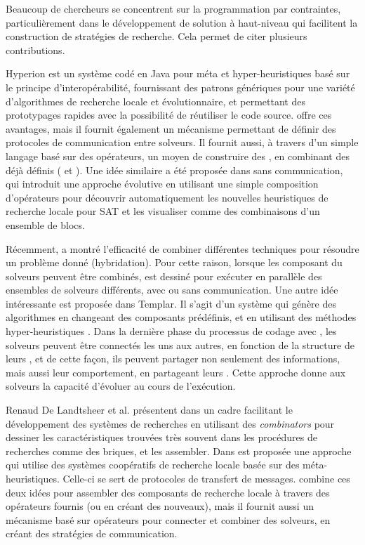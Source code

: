Beaucoup de chercheurs se concentrent sur la programmation par contraintes, particuli\`erement dans le d\'eveloppement de solution \`a haut-niveau qui facilitent la construction de strat\'egies de recherche. Cela permet de citer plusieurs contributions. 

{\sc Hyperion} \cite{Brownlee2014} est un syst\`eme cod\'e en Java pour m\'eta et hyper-heuristiques bas\'e sur le principe d'interop\'erabilit\'e, fournissant des patrons g\'en\'eriques pour une vari\'et\'e d'algorithmes de recherche locale et \'evolutionnaire, et permettant des prototypages rapides avec la possibilit\'e de r\'eutiliser le code source. \posl{} offre ces avantages, mais il fournit \'egalement un m\'ecanisme permettant de d\'efinir des protocoles de communication entre solveurs. Il fournit aussi, \`a travers d'un simple langage bas\'e sur des op\'erateurs, un moyen de construire des \ass, en combinant des \ms{} d\'ej\`a d\'efinis (\oms{} et \opchs). Une id\'ee similaire a \'et\'e propos\'ee dans \cite{Fukunaga2008} sans communication, qui introduit une approche \'evolutive en utilisant une simple composition d'op\'erateurs pour d\'ecouvrir automatiquement les nouvelles heuristiques de recherche locale pour SAT et les visualiser comme des combinaisons d'un ensemble de blocs.

R\'ecemment, \cite{El-Ghazali2013} a montr\'e l'efficacit\'e de combiner diff\'erentes techniques pour r\'esoudre un probl\`eme donn\'e (hybridation). Pour cette raison, lorsque les composant du solveurs peuvent \^etre combin\'es, \posl{} est dessin\'e pour ex\'ecuter en parall\`ele des ensembles de solveurs diff\'erents, avec ou sans communication. Une autre id\'ee int\'eressante est propos\'ee dans {\sc Templar}. Il s'agit d'un syst\`eme qui g\'en\`ere des algorithmes en changeant des composants pr\'ed\'efinis, et en utilisant des m\'ethodes hyper-heuristiques \cite{Swan2015}. Dans la derni\`ere phase du processus de codage avec \posl{}, les solveurs peuvent \^etre connect\'es les uns aux autres, en fonction de la structure de leurs \opchs, et de cette fa\c{c}on, ils peuvent partager non seulement des informations, mais aussi leur comportement, en partageant leurs \oms. Cette approche donne aux solveurs la capacit\'e d'\'evoluer au cours de l'ex\'ecution.

Renaud De Landtsheer et al. pr\'esentent dans \cite{Landtsheer2015} un cadre facilitant le d\'eveloppement des syst\`emes de recherches en utilisant des \textit{combinators} pour dessiner les caract\'eristiques trouv\'ees tr\`es souvent dans les proc\'edures de recherches comme des briques, et les assembler. Dans \cite{Martin2016} est propos\'ee une approche qui utilise des syst\`emes coop\'eratifs de recherche locale bas\'ee sur des m\'eta-heuristiques. Celle-ci se sert de protocoles de transfert de messages. \posl{} combine ces deux id\'ees pour assembler des composants de recherche locale \`a travers des op\'erateurs fournis (ou en cr\'eant des nouveaux), mais il fournit aussi un m\'ecanisme bas\'e sur op\'erateurs pour connecter et combiner des solveurs, en cr\'eant des strat\'egies de communication.

